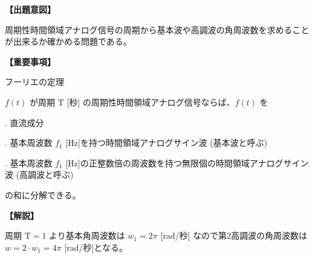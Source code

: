\noindent \textbf{【出題意図】}

\noindent 周期性時間領域アナログ信号の周期から基本波や高調波の角周波数を求めることが出来るか確かめる問題である。

\vspace{1em}
\noindent \textbf{【重要事項】}

\noindent フーリエの定理

\smallskip
$f(t)$ が周期 $\textrm{T}$ [秒] の周期性時間領域アナログ信号ならば、$f(t)$ を

. 直流成分

. 基本周波数 $f_1$ [Hz]を持つ時間領域アナログサイン波 (基本波と呼ぶ)

. 基本周波数 $f_1$ [Hz]の正整数倍の周波数を持つ無限個の時間領域アナログサイン波 (高調波と呼ぶ)

\smallskip
の和に分解できる。


\vspace{1em}
\noindent \textbf{【解説】}

\noindent 周期 $\textrm{T}=1$ より基本角周波数は $w_1 = 2\pi$ [rad/秒] なので第2高調波の角周波数は $w = 2\cdot w_1 = 4\pi$ [rad/秒]となる。
